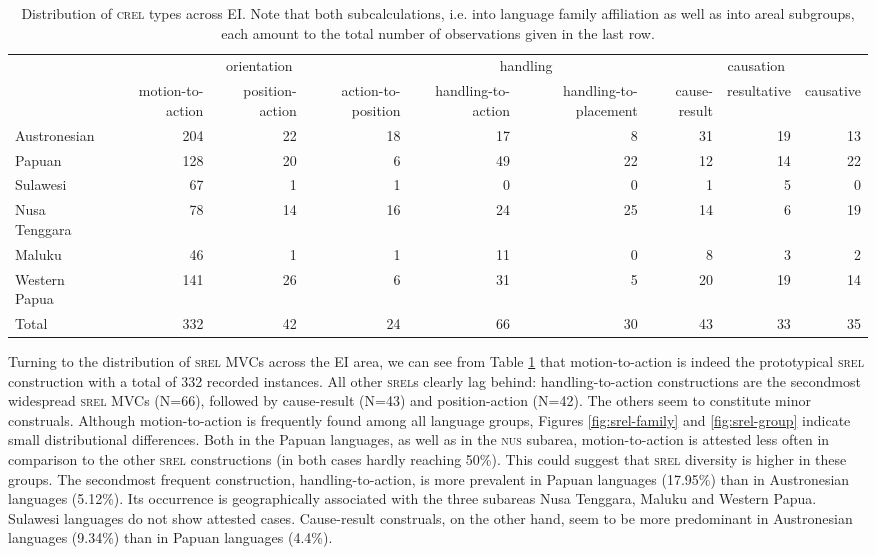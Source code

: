 \begin{table}


\begin{tabular}{lrrrrrrrr}
  \lsptoprule
&\multicolumn{3}{c|}{orientation} & \multicolumn{2}{c|}{handling} & \multicolumn{3}{c}{causation} \\
 & {motion-to-action} & {position-action} & {action-to-position} & {handling-to-action} & {handling-to-placement} & {cause-result} & {resultative} & {causative} \\  
  \hline
  Austronesian & 204 & 22 & 18 & 17 & 8 & 31 & 19 & 13 \tabularnewline
  Papuan & 128 & 20 &  6 &  49 & 22 & 12 & 14 & 22 \tabularnewline
   \hline
  Sulawesi & 67 & 1 & 1 & 0 & 0 & 1 & 5 & 0 \tabularnewline
  Nusa Tenggara & 78 & 14 & 16 & 24 & 25 & 14 & 6 & 19 \tabularnewline
  Maluku & 46 & 1 & 1 & 11 & 0 & 8 & 3 & 2 \tabularnewline 
  Western Papua & 141 & 26 & 6 & 31 & 5 & 20 & 19 & 14 \tabularnewline 
\lsptoprule
Total & 332 & 42 & 24 & 66 & 30 & 43 & 33 & 35 \tabularnewline
\hline
\end{tabular}
\caption[Distribution of \textsc{srel} types across EI]{Distribution of \textsc{crel} types across EI. Note that both subcalculations, i.e. into language family affiliation as well as into areal subgroups, each amount to the total number of observations given in the last row.}
\label{table:SREL_overview}


\end{table}


Turning to the distribution of \textsc{srel} MVCs across the EI area, we can see from Table \ref{table:SREL_overview} that motion-to-action is indeed the prototypical \textsc{srel} construction with a total of 332 recorded instances. All other \textsc{srel}s clearly lag behind: handling-to-action constructions are the secondmost widespread \textsc{srel} MVCs (N=66), followed by cause-result (N=43) and position-action (N=42). The others seem to constitute minor construals. Although motion-to-action is frequently found among all language groups, Figures \ref{fig:srel-family} and \ref{fig:srel-group} indicate small distributional differences. Both in the Papuan languages, as well as in the \textsc{nus} subarea, motion-to-action is attested less often in comparison to the other \textsc{srel} constructions (in both cases hardly reaching 50\%). This could suggest that \textsc{srel} diversity is higher in these groups. The secondmost frequent construction, handling-to-action, is more prevalent in Papuan languages (17.95\%) than in Austronesian languages (5.12\%). Its occurrence is geographically associated with the three subareas Nusa Tenggara, Maluku and Western Papua. Sulawesi languages do not show attested cases. Cause-result construals, on the other hand, seem to be more predominant in Austronesian languages (9.34\%) than in Papuan languages (4.4\%).

